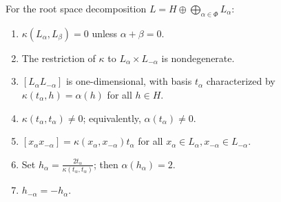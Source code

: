 For the root space decomposition $L = H \oplus \bigoplus_{\alpha \in \Phi} L_{\alpha}$:
\begin{enumerate}
\item[(a)] $\kappa(L_{\alpha}, L_{\beta}) = 0$ unless $\alpha + \beta = 0$.
\item[(b)] The restriction of $\kappa$ to $L_{\alpha} \times L_{-\alpha}$ is nondegenerate.
\item[(c)] $[L_{\alpha} L_{-\alpha}]$ is one-dimensional, with basis $t_{\alpha}$ characterized by $\kappa(t_{\alpha}, h) = \alpha(h)$ for all $h \in H$.
\item[(d)] $\kappa(t_{\alpha}, t_{\alpha}) \neq 0$; equivalently, $\alpha(t_{\alpha}) \neq 0$.
\item[(e)] $[x_{\alpha} x_{-\alpha}] = \kappa(x_{\alpha}, x_{-\alpha}) t_{\alpha}$ for all $x_{\alpha} \in L_{\alpha}, x_{-\alpha} \in L_{-\alpha}$.
\item[(f)] Set $h_{\alpha} = \frac{2 t_{\alpha}}{\kappa(t_{\alpha}, t_{\alpha})}$; then $\alpha(h_{\alpha}) = 2$.
\item[(g)] $h_{-\alpha} = -h_{\alpha}$.
\end{enumerate}
